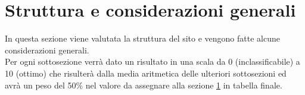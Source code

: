 \section{Struttura e considerazioni generali}\label{struct}
In questa sezione viene valutata la struttura del sito e vengono 
fatte alcune considerazioni generali. \\
Per ogni sottosezione verrà dato un risultato
in una scala da 0 (inclassificabile) a 10 (ottimo) che risulterà dalla media 
aritmetica delle ulteriori sottosezioni ed avrà un peso del 50\% nel valore da assegnare
alla sezione \ref{struct} in tabella finale.
  
  
